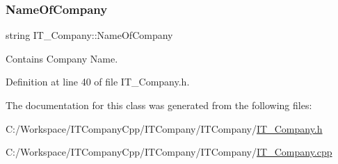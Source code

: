 \subsubsection{\texorpdfstring{Name\+Of\+Company}{NameOfCompany}}
{\footnotesize\ttfamily string I\+T\+\_\+\+Company\+::\+Name\+Of\+Company\hspace{0.3cm}{\ttfamily [private]}}



Contains Company Name. 



Definition at line 40 of file I\+T\+\_\+\+Company.\+h.



The documentation for this class was generated from the following files\+:\begin{DoxyCompactItemize}
\item 
C\+:/\+Workspace/\+I\+T\+Company\+Cpp/\+I\+T\+Company/\+I\+T\+Company/\hyperlink{_i_t___company_8h}{I\+T\+\_\+\+Company.\+h}\item 
C\+:/\+Workspace/\+I\+T\+Company\+Cpp/\+I\+T\+Company/\+I\+T\+Company/\hyperlink{_i_t___company_8cpp}{I\+T\+\_\+\+Company.\+cpp}\end{DoxyCompactItemize}
